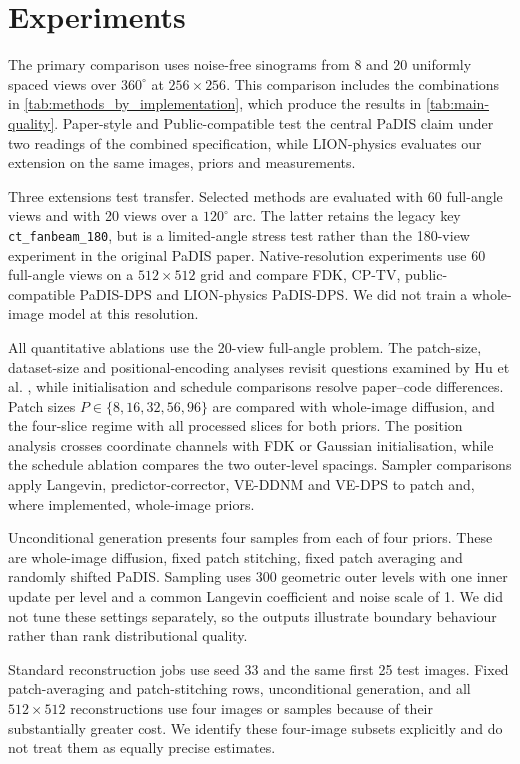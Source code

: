 \section{Experiments}

The primary comparison uses noise-free sinograms from 8 and 20 uniformly spaced views over \(360^\circ\) at \(256\times256\). This comparison includes the combinations in \autoref{tab:methods_by_implementation}, which produce the results in \autoref{tab:main-quality}. Paper-style and Public-compatible test the central PaDIS claim under two readings of the combined specification, while LION-physics evaluates our extension on the same images, priors and measurements.

Three extensions test transfer. Selected methods are evaluated with 60 full-angle views and with 20 views over a \(120^\circ\) arc. The latter retains the legacy key \texttt{ct\_fanbeam\_180}, but is a limited-angle stress test rather than the 180-view experiment in the original PaDIS paper. Native-resolution experiments use 60 full-angle views on a \(512\times512\) grid and compare FDK, CP-TV, public-compatible PaDIS-DPS and LION-physics PaDIS-DPS. We did not train a whole-image model at this resolution.

All quantitative ablations use the 20-view full-angle problem. The patch-size, dataset-size and positional-encoding analyses revisit questions examined by Hu et al. \cite{}, while initialisation and schedule comparisons resolve paper--code differences. Patch sizes \(P\in\{8,16,32,56,96\}\) are compared with whole-image diffusion, and the four-slice regime with all processed slices for both priors. The position analysis crosses coordinate channels with FDK or Gaussian initialisation, while the schedule ablation compares the two outer-level spacings. Sampler comparisons apply Langevin, predictor-corrector, VE-DDNM and VE-DPS to patch and, where implemented, whole-image priors.

Unconditional generation presents four samples from each of four priors. These are whole-image diffusion, fixed patch stitching, fixed patch averaging and randomly shifted PaDIS. Sampling uses 300 geometric outer levels with one inner update per level and a common Langevin coefficient and noise scale of 1. We did not tune these settings separately, so the outputs illustrate boundary behaviour rather than rank distributional quality.

Standard reconstruction jobs use seed 33 and the same first 25 test images. Fixed patch-averaging and patch-stitching rows, unconditional generation, and all \(512\times512\) reconstructions use four images or samples because of their substantially greater cost. We identify these four-image subsets explicitly and do not treat them as equally precise estimates.

